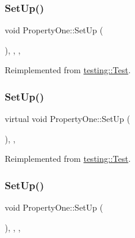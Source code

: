 \subsubsection{\texorpdfstring{SetUp()}{SetUp()}\hspace{0.1cm}{\footnotesize\ttfamily [1/3]}}
{\footnotesize\ttfamily void Property\+One\+::\+Set\+Up (\begin{DoxyParamCaption}{ }\end{DoxyParamCaption})\hspace{0.3cm}{\ttfamily [inline]}, {\ttfamily [override]}, {\ttfamily [protected]}, {\ttfamily [virtual]}}



Reimplemented from \mbox{\hyperlink{classtesting_1_1_test_a190315150c303ddf801313fd1a777733}{testing\+::\+Test}}.

\mbox{\label{class_property_one_a9cb7d7cb508d5f1a6fc7cfead81ebc2b}} 
\subsubsection{\texorpdfstring{SetUp()}{SetUp()}\hspace{0.1cm}{\footnotesize\ttfamily [2/3]}}
{\footnotesize\ttfamily virtual void Property\+One\+::\+Set\+Up (\begin{DoxyParamCaption}{ }\end{DoxyParamCaption})\hspace{0.3cm}{\ttfamily [inline]}, {\ttfamily [protected]}, {\ttfamily [virtual]}}



Reimplemented from \mbox{\hyperlink{classtesting_1_1_test_a190315150c303ddf801313fd1a777733}{testing\+::\+Test}}.

\mbox{\label{class_property_one_a0a31b0c199b14438b9cfbd27645aa542}} 
\subsubsection{\texorpdfstring{SetUp()}{SetUp()}\hspace{0.1cm}{\footnotesize\ttfamily [3/3]}}
{\footnotesize\ttfamily void Property\+One\+::\+Set\+Up (\begin{DoxyParamCaption}{ }\end{DoxyParamCaption})\hspace{0.3cm}{\ttfamily [inline]}, {\ttfamily [override]}, {\ttfamily [protected]}, {\ttfamily [virtual]}}



